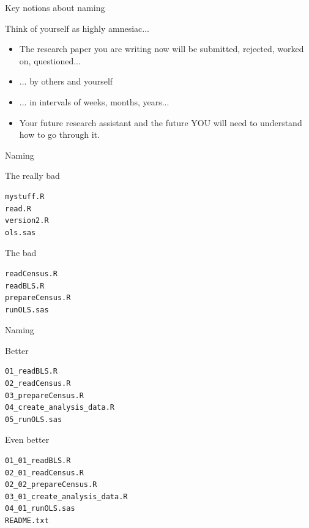 \documentclass[xcolor=table,compress]{beamer}
\begin{document}
\begin{frame}{Key notions about naming}
\begin{block}{Think of yourself as highly amnesiac...}
\begin{itemize}[<+->]
\item The research paper you are writing now will be submitted, rejected, worked on, questioned... 
\item ... by others and yourself
\item ... in intervals of weeks, months, years...
\item Your future research assistant and the future YOU will need to understand how to go through it.
\end{itemize}
\end{block}
\end{frame}



\begin{frame}[fragile]{Naming}
\begin{block}{The really bad}
\begin{lstlisting}[language=bash,numbers=none]
mystuff.R
read.R
version2.R
ols.sas
\end{lstlisting}
\end{block}
\pause
\begin{block}{The bad}
\begin{lstlisting}[language=bash,numbers=none]
readCensus.R
readBLS.R
prepareCensus.R
runOLS.sas
\end{lstlisting}
\end{block}
\end{frame}



\begin{frame}[fragile]{Naming}
\begin{block}{Better}
\begin{lstlisting}[language=bash,numbers=none]
01_readBLS.R
02_readCensus.R
03_prepareCensus.R
04_create_analysis_data.R
05_runOLS.sas
\end{lstlisting}
\end{block}
\pause
\begin{block}{Even better}
\begin{lstlisting}[language=bash,numbers=none]
01_01_readBLS.R
02_01_readCensus.R
02_02_prepareCensus.R
03_01_create_analysis_data.R
04_01_runOLS.sas
README.txt
\end{lstlisting}
\end{block}
\end{frame}
\end{document}
